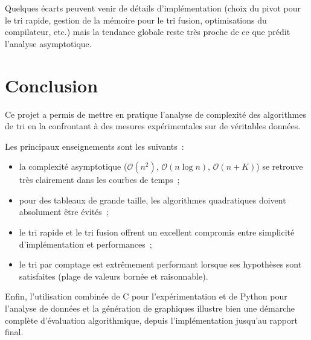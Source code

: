 \documentclass[11pt,a4paper]{article}
\begin{document}
Quelques écarts peuvent venir de détails d'implémentation (choix du
pivot pour le tri rapide, gestion de la mémoire pour le tri fusion,
optimisations du compilateur, etc.) mais la tendance globale reste très
proche de ce que prédit l'analyse asymptotique.

\section{Conclusion}

Ce projet a permis de mettre en pratique l'analyse de complexité des
algorithmes de tri en la confrontant à des mesures expérimentales sur
de véritables données.

Les principaux enseignements sont les suivants~:

\begin{itemize}
  \item la complexité asymptotique ($\mathcal{O}(n^2)$,
        $\mathcal{O}(n \log n)$, $\mathcal{O}(n + K)$) se retrouve très
        clairement dans les courbes de temps~;
  \item pour des tableaux de grande taille, les algorithmes quadratiques
        doivent absolument être évités~;
  \item le tri rapide et le tri fusion offrent un excellent compromis
        entre simplicité d'implémentation et performances~;
  \item le tri par comptage est extrêmement performant lorsque ses
        hypothèses sont satisfaites (plage de valeurs bornée et
        raisonnable).
\end{itemize}

Enfin, l'utilisation combinée de C pour l'expérimentation et de Python
pour l'analyse de données et la génération de graphiques illustre bien
une démarche complète d'évaluation algorithmique, depuis l'implémentation
jusqu'au rapport final.
\end{document}
